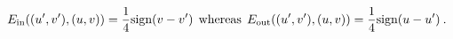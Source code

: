 \begin{equation}E_{\mbox{\scriptsize in}}((u',v'),(u,v))= \frac{1}{4}\mbox{sign}(v-v') \:\:\mbox{whereas}\:\:
 E_{\mbox{\scriptsize out}}((u',v'),(u,v))= \frac{1}{4}\mbox{sign}(u-u')\:.\label{E+E'}\end{equation} 
